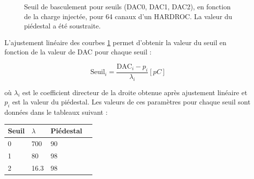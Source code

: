 \begin{figure}[ht!]
	\centering
	\hfill
	\hfill
	\caption{Seuil de basculement pour seuils (DAC0, DAC1, DAC2), en fonction de la charge injectée, pour \num{64} canaux d'un HARDROC. La valeur du piédestal a été soustraite.}
	\label{seuils}
\end{figure}%

L'ajustement linéaire des courbes \ref{seuils} permet d'obtenir la valeur du seuil en fonction de la valeur de DAC pour chaque seuil :

\begin{equation}
\mbox{Seuil}_{i}=\frac{\mbox{DAC}_{i}-p_{i}}{\lambda_{i}} [pC]
\label{equationn}
\end{equation}

où $\lambda_{i}$ est le coefficient directeur de la droite obtenue après ajustement linéaire et $p_{i}$ est la valeur du piédestal. Les valeurs de ces paramètres pour chaque seuil sont données dans le tableaux suivant :

\begin{table}[H]
	\centering
\begin{tabular}{|O|O|O|N}
	\hline 
	Seuil & $\lambda$ & Piédestal \\ 
	\hline 
	\num{0}&\num{700} &\num{90} \\ 
	\hline 
	\num{1}& \num{80} & \num{98} \\ 
	\hline 
	\num{2}&\num{16.3} &\num{98} \\ 
	\hline 
\end{tabular} 
\end{table}

